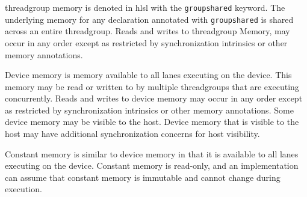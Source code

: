 
\p \gls{threadgroup} memory is denoted in \acrshort{hlsl} with the
\texttt{groupshared} keyword. The underlying memory for any declaration
annotated with \texttt{groupshared} is shared across an entire
\gls{threadgroup}. Reads and writes to \gls{threadgroup} Memory, may occur in
any order except as restricted by synchronization intrinsics or other memory
annotations.


\p Device memory is memory available to all \gls{lane}s executing on the device.
This memory may be read or written to by multiple \gls{threadgroup}s that are
executing concurrently. Reads and writes to device memory may occur in any order
except as restricted by synchronization intrinsics or other memory annotations.
Some device memory may be visible to the host. Device memory that is visible to
the host may have additional synchronization concerns for host visibility.


\p Constant memory is similar to device memory in that it is available to all
\gls{lane}s executing on the device. Constant memory is read-only, and an
implementation can assume that constant memory is immutable and cannot change
during execution.
